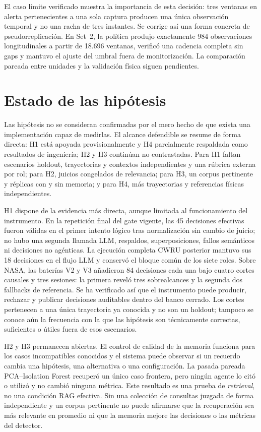 El caso límite verificado muestra la importancia de esta decisión: tres
ventanas en alerta pertenecientes a una sola captura producen una única
observación temporal y no una racha de tres instantes. Se corrige así una forma
concreta de pseudorreplicación. En Set~2, la política produjo exactamente 984
observaciones longitudinales a partir de 18.696 ventanas, verificó una cadencia
completa sin gaps y mantuvo el ajuste del umbral fuera de monitorización. La
comparación pareada entre unidades y la validación física siguen pendientes.

\section{Estado de las hipótesis}

Las hipótesis no se consideran confirmadas por el mero hecho de que exista una
implementación capaz de medirlas. El alcance defendible se resume de forma
directa: H1 está apoyada provisionalmente y H4 parcialmente respaldada como
resultados de ingeniería; H2 y H3 continúan no contrastadas. Para H1 faltan
escenarios holdout, trayectorias y contextos independientes y una rúbrica
externa por rol;
para H2, juicios congelados de relevancia; para H3, un corpus pertinente y
réplicas con y sin memoria; y para H4, más trayectorias y referencias físicas
independientes.

H1 dispone de la evidencia más directa, aunque limitada al funcionamiento del
instrumento. En la repetición final del gate vigente, las 45 decisiones
efectivas fueron válidas en el primer intento lógico tras normalización sin
cambio de juicio; no hubo una segunda llamada LLM, respaldos, superposiciones,
fallos semánticos ni decisiones no agénticas. La ejecución completa CWRU
posterior mantuvo sus 18 decisiones en el flujo LLM y conservó el bloque común
de los siete roles. Sobre NASA, las baterías V2 y V3 añadieron 84 decisiones cada
una bajo cuatro cortes causales y tres sesiones: la primera reveló tres
sobrealcances y la segunda dos fallbacks de referencia. Se ha verificado así que
el instrumento puede producir, rechazar y publicar decisiones auditables dentro
del banco cerrado. Los cortes pertenecen a una única trayectoria ya conocida y
no son un holdout; tampoco se conoce aún la frecuencia con la que las hipótesis
son técnicamente correctas, suficientes o útiles fuera de esos escenarios.

H2 y H3 permanecen abiertas. El control de calidad de la memoria funciona para
los casos incompatibles conocidos y el sistema puede observar si un recuerdo
cambia una hipótesis, una alternativa o una configuración. La pasada pareada
PCA--Isolation Forest recuperó un único caso frontera, pero ningún agente lo
citó o utilizó y no cambió ninguna métrica. Este resultado es una prueba de
\emph{retrieval}, no una condición RAG efectiva. Sin una colección de consultas
juzgada de forma independiente y un corpus pertinente no puede afirmarse que
la recuperación sea más relevante en promedio ni que la memoria mejore las
decisiones o las métricas del detector.

